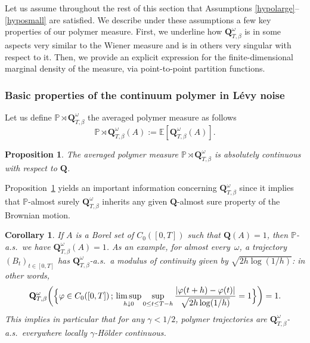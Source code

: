 \documentclass[10pt]{amsart}
\newtheorem{proposition}[theorem]{Proposition}
\newtheorem{cor}[theorem]{Corollary}
\theoremstyle{definition}
\newcommand{\bQ}{{\ensuremath{\mathbf Q}} }
\newcommand{\bbE}{{\ensuremath{\mathbb E}} }
\newcommand{\bbP}{{\ensuremath{\mathbb P}} }
\let\gb\beta
\let\go\omega
\begin{document}
\label{sec:mainprop}

Let us assume throughout the rest of this section that Assumptions \eqref{hypolarge}--\eqref{hyposmall} are satisfied.
We describe under these assumptions a few key properties of our polymer measure. First, we underline how $\bQ^{\go}_{T,\beta}$ is in some aspects very similar to the Wiener measure and is in others very singular with respect to it.
Then, we provide an explicit expression for the finite-dimensional marginal density of the measure, via point-to-point partition functions.

\subsubsection{Basic properties of the continuum polymer in Lévy noise}
\label{bazics}

Let us define $\bbP\rtimes\bQ^{\go}_{T,\beta}$ the averaged polymer measure as follows
\begin{equation}
\bbP\rtimes\bQ^{\go}_{T,\beta}(A):= \bbE[\bQ^{\go}_{T,\beta}(A) ].
\end{equation}

\begin{proposition} \label{abzolute}
The averaged polymer measure
$\bbP\rtimes \bQ^{\go}_{T,\beta}$ is absolutely continuous with respect to $\bQ$.
\end{proposition}

 Proposition~\ref{abzolute} yields an important information concerning $\bQ^{\go}_{T,\beta}$ since it implies that $\bbP$-almost surely $ \bQ^{\go}_{T,\beta}$ inherits any given $\bQ$-almost sure property of the Brownian motion.

\begin{cor}
If $A$ is a Borel set of $C_0([0,T])$ such that $\bQ(A)=1$, then $\bbP$-a.s.\ we have $ \bQ^{\go}_{T,\beta}(A)=1$.
As an example,
for almost every~$\go$, a trajectory $(B_t)_{t\in [0,T]}$
has $\bQ_{T,\gb}^{\go}$-a.s.\ a modulus of continuity
given by $\sqrt{2h \log(1/h)}$: in other words,
\[
\bQ_{T,\gb}^{\go} \bigg(\Bigl\{ \varphi \in C_0([0,T]) \,; \, \limsup_{h\downarrow 0} \sup_{ 0\leq t \leq T-h} \frac{|\varphi(t+h) - \varphi(t)|}{ \sqrt{2h \log(1/h)}} =1 \Bigr\} \bigg) =1.
\]
This implies in particular that for any $\gamma<1/2$,
polymer trajectories are $\bQ_{T,\gb}^{\go}$-a.s.\ everywhere locally $\gamma$-Hölder continuous.
\end{cor}
\end{document}
